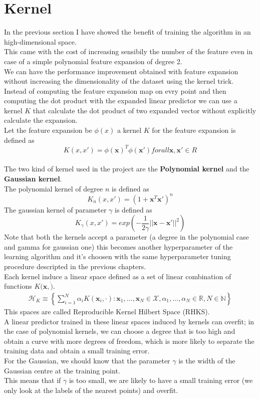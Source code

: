 \newpage
\section{Kernel}
In the previous section I have showed the benefit of training the algorithm in an high-dimensional space.\\
This came with the cost of increasing sensibily the number of the feature even in case of a simple polynomial feature expansion of degree 2.\\
We can have the performance improvement obtained with feature expansion without increasing the dimensionality of the dataset using the kernel trick.\\
Instead of computing the feature expansion map on evry point and then computing the dot product with the expanded linear predictor we can use a kernel $K$ that calculate the dot product of two expanded vector without explicitly calculate the expansion.\\
Let the feature expansion be $\phi(x)$ a kernel $K$ for the feature expansion is defined as $$K(x, x') = \phi(\boldsymbol{x})^T \phi(\boldsymbol{x'})  for all \boldsymbol{x}, \boldsymbol{x'} \in R$$\\
The two kind of kernel used in the project are the \textbf{Polynomial kernel} and the \textbf{Gaussian kernel}.\\
The polynomial kernel of degree $n$ is defined as $$K_n(x, x') = (1 + \boldsymbol{x}^T \boldsymbol{x'})^n$$
The gaussian kernel of parameter $\gamma$ is defined as $$K_\gamma(x, x') = exp(-\frac{1}{2\gamma}||\boldsymbol{x} - \boldsymbol{x'}||^2)$$
Note that both the kernels accept a parameter (a degree in the polynomial case and gamma for gaussian one) this becomes another hyperparameter of the learning algorithm
and it's choosen with the same hyperparameter tuning procedure descripted in the previous chapters.\\ 
Each kernel induce a linear space defined as a set of linear combination of functions $K(\boldsymbol{x}, \dot)$.\\
\begin{align*}
    \mathcal{H}_K \equiv \left\{ \sum_{i=1}^N \alpha_i K(\boldsymbol{x}_i, \cdot) : \boldsymbol{x}_1, \dots, \boldsymbol{x}_N \in \mathcal{X}, \alpha_1, \dots, \alpha_N \in \mathbb{R}, N \in \mathbb{N} \right\}
\end{align*}
This spaces are called Reproducible Kernel Hilbert Space (RHKS).\\
A linear predictor trained in these linear spaces induced by kernels can overfit; in the case of polynomial kernels, we can choose a degree that is too high and obtain a curve with more degrees of freedom, which is more likely to separate the training data and obtain a small training error.\\
For the Gaussian, we should know that the parameter $\gamma$ is the width of the Gaussian centre at the training point.\\
This means that if $\gamma$ is too small, we are likely to have a small training error (we only look at the labels of the nearest points) and overfit.\\


